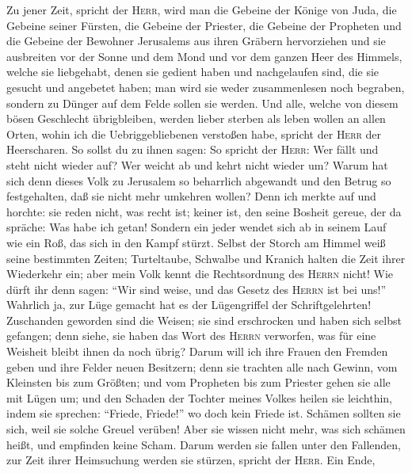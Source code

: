  Zu jener Zeit, spricht der \textsc{Herr}, wird man die
Gebeine der Könige von Juda, die Gebeine seiner Fürsten, die Gebeine der
Priester, die Gebeine der Propheten und die Gebeine der Bewohner
Jerusalems aus ihren Gräbern hervorziehen  und sie
ausbreiten vor der Sonne und dem Mond und vor dem ganzen Heer des
Himmels, welche sie liebgehabt, denen sie gedient haben und nachgelaufen
sind, die sie gesucht und angebetet haben; man wird sie weder
zusammenlesen noch begraben, sondern zu Dünger auf dem Felde sollen sie
werden.  Und alle, welche von diesem bösen Geschlecht
übrigbleiben, werden lieber sterben als leben wollen an allen Orten,
wohin ich die Uebriggebliebenen verstoßen habe, spricht der
\textsc{Herr} der Heerscharen.  So sollst du zu ihnen
sagen: So spricht der \textsc{Herr}: Wer fällt und steht nicht wieder
auf? Wer weicht ab und kehrt nicht wieder um?  Warum hat
sich denn dieses Volk zu Jerusalem so beharrlich abgewandt und den
Betrug so festgehalten, daß sie nicht mehr umkehren wollen?
 Denn ich merkte auf und horchte: sie reden nicht, was
recht ist; keiner ist, den seine Bosheit gereue, der da spräche: Was
habe ich getan! Sondern ein jeder wendet sich ab in seinem Lauf wie ein
Roß, das sich in den Kampf stürzt.  Selbst der Storch am
Himmel weiß seine bestimmten Zeiten; Turteltaube, Schwalbe und Kranich
halten die Zeit ihrer Wiederkehr ein; aber mein Volk kennt die
Rechtsordnung des \textsc{Herrn} nicht!  Wie dürft ihr
denn sagen: ``Wir sind weise, und das Gesetz des \textsc{Herrn} ist bei
uns!'' Wahrlich ja, zur Lüge gemacht hat es der Lügengriffel der
Schriftgelehrten!  Zuschanden geworden sind die Weisen;
sie sind erschrocken und haben sich selbst gefangen; denn siehe, sie
haben das Wort des \textsc{Herrn} verworfen, was für eine Weisheit
bleibt ihnen da noch übrig?  Darum will ich ihre Frauen
den Fremden geben und ihre Felder neuen Besitzern; denn sie trachten
alle nach Gewinn, vom Kleinsten bis zum Größten; und vom Propheten bis
zum Priester gehen sie alle mit Lügen um;  und den
Schaden der Tochter meines Volkes heilen sie leichthin, indem sie
sprechen: ``Friede, Friede!'' wo doch kein Friede ist. 
Schämen sollten sie sich, weil sie solche Greuel verüben! Aber sie
wissen nicht mehr, was sich schämen heißt, und empfinden keine Scham.
Darum werden sie fallen unter den Fallenden, zur Zeit ihrer Heimsuchung
werden sie stürzen, spricht der \textsc{Herr}.  Ein Ende,
